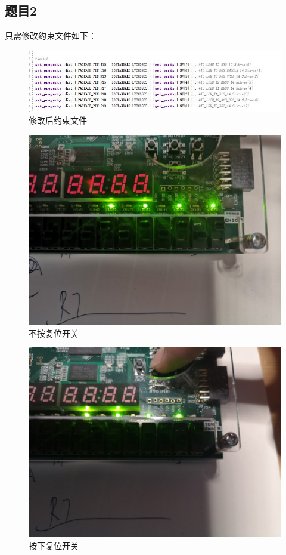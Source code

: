 \documentclass[UTF8]{article}
\begin{document}
	\subsection{题目2}
	只需修改约束文件如下：
	\begin{figure}[H]
		\centering
		\includegraphics[width=1\linewidth]{e2.jpg}
		\caption{修改后约束文件}
		\label{e2}
	\end{figure}\par

	\begin{figure}[H]
		\centering
		\includegraphics[width=1\linewidth]{e2_1.jpg}
		\caption{不按复位开关}
		\label{e2_1}
	\end{figure}\par
	\begin{figure}[H]
	\centering
	\includegraphics[width=1\linewidth]{e2_2.jpg}
	\caption{按下复位开关}
	\label{e2_2}
	\end{figure}\par
	
\end{document}
